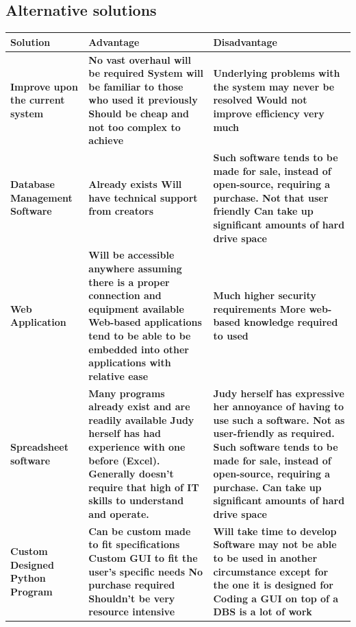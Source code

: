 \subsection{Alternative solutions}
    \begin{tabular}{|p{4cm}|p{4cm}|p{4cm}|}
	\hline
	\textbf{Solution} & \textbf{Advantage} & \textbf{Disadvantage} \\ \hline
	\textbf{Improve upon the current system} & \textbf{No vast overhaul will be required
System will be familiar to those who used it previously
Should be cheap and not too complex to achieve
} & \textbf{Underlying problems with the system may never be resolved
Would not improve efficiency very much
} \\ \hline
	\textbf{Database Management Software} & \textbf{Already exists
Will have technical support from creators
} & \textbf{Such software tends to be made for sale, instead of open-source, requiring a purchase.
Not that user friendly
Can take up significant amounts of hard drive space
} \\ \hline
	\textbf{Web Application} & \textbf{Will be accessible anywhere assuming there is a proper connection and equipment available
Web-based applications tend to be able to be embedded into other applications with relative ease
} & \textbf{Much higher security requirements
More web-based knowledge required to used
} \\ \hline
	\textbf{Spreadsheet software} & \textbf{Many programs already exist and are readily available
Judy herself has had experience with one before (Excel).
Generally doesn’t require that high of IT skills to understand and operate.
} & \textbf{Judy herself has expressive her annoyance of having to use such a software.
Not as user-friendly as required.
Such software tends to be made for sale, instead of open-source, requiring a purchase.
Can take up significant amounts of hard drive space
} \\ \hline
	\textbf{Custom Designed Python Program} & \textbf{Can be custom made to fit specifications
Custom GUI to fit the user’s specific needs
No purchase required
Shouldn’t be very resource intensive
} & \textbf{Will take time to develop
Software may not be able to be used in another circumstance except for the one it is designed for
Coding a GUI on top of a DBS is a lot of work
} \\ \hline
	\end{tabular}

